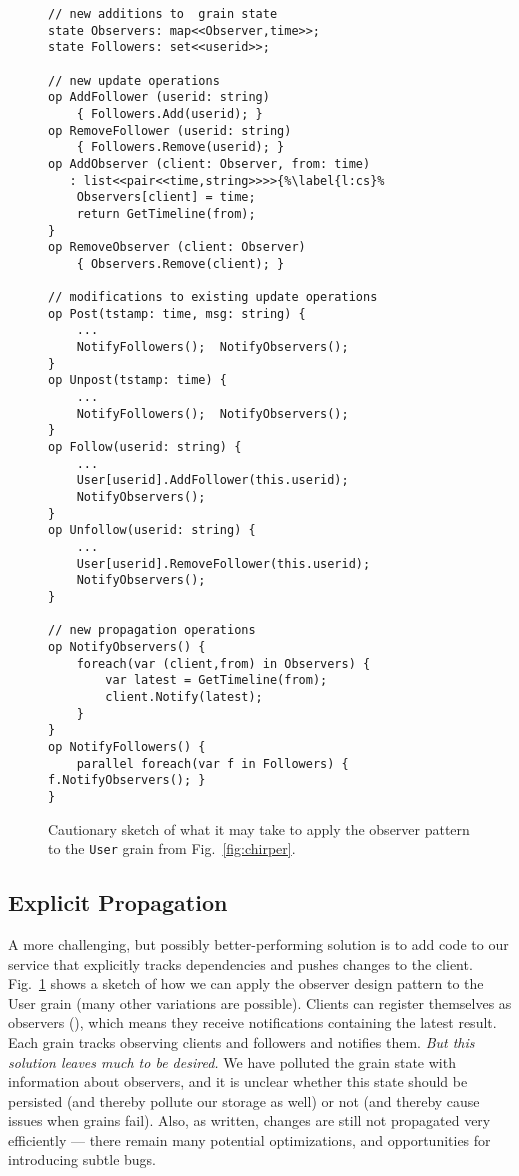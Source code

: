 \begin{figure}
\begin{lstlisting}
// new additions to  grain state
state Observers: map<<Observer,time>>; 
state Followers: set<<userid>>; 	

// new update operations
op AddFollower (userid: string)
	{ Followers.Add(userid); }
op RemoveFollower (userid: string)
	{ Followers.Remove(userid); }
op AddObserver (client: Observer, from: time)
   : list<<pair<<time,string>>>>{%\label{l:cs}%
 	Observers[client] = time; 
 	return GetTimeline(from);
}
op RemoveObserver (client: Observer)
	{ Observers.Remove(client); }

// modifications to existing update operations
op Post(tstamp: time, msg: string) { 
	...
	NotifyFollowers();  NotifyObservers();
} 
op Unpost(tstamp: time) { 
	...
	NotifyFollowers();  NotifyObservers();
}
op Follow(userid: string) {  
	... 
	User[userid].AddFollower(this.userid);
	NotifyObservers();
}
op Unfollow(userid: string) { 
	...  
	User[userid].RemoveFollower(this.userid);
	NotifyObservers(); 
}

// new propagation operations
op NotifyObservers() {
	foreach(var (client,from) in Observers) {
		var latest = GetTimeline(from);
		client.Notify(latest);
	}
}
op NotifyFollowers() {
	parallel foreach(var f in Followers) { f.NotifyObservers(); }
}
\end{lstlisting}
\caption{Cautionary sketch of what it may take to apply the observer pattern to the \lstinline|User| grain from Fig.~\ref{fig:chirper}.}\label{fig:observers}
\end{figure}

\subsection{Explicit Propagation}\label{sec:observers}

A more challenging, but possibly better-performing solution is to add code to our service that explicitly tracks dependencies and pushes changes to the client. Fig.~\ref{fig:observers} shows a sketch of how we can apply the observer design pattern to the User grain (many other variations are possible). Clients can register themselves as observers (), which means they receive notifications containing the latest result. Each grain  tracks observing clients and followers and notifies them. \emph{But this solution leaves much to be desired. } We have polluted the grain state with information about observers, and it is unclear whether this state should be persisted (and thereby pollute our storage as well) or not (and thereby cause issues when grains fail). Also, as written, changes are still not propagated very efficiently --- there remain many potential optimizations, and opportunities for introducing subtle bugs. 

